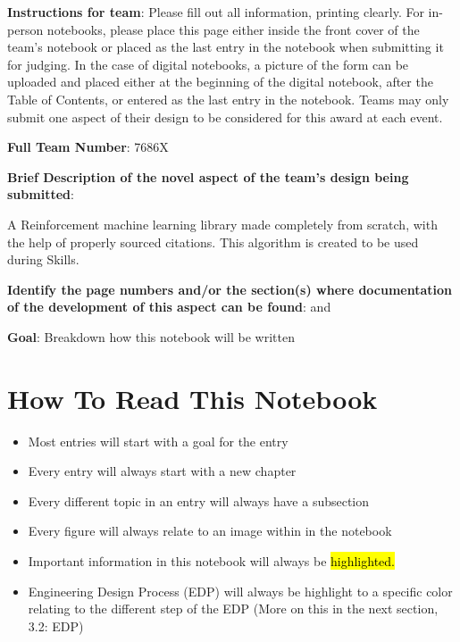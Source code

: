 \textbf{Instructions for team}: Please fill out all information, printing clearly. For in-person notebooks, please place this page either inside the front cover of the team’s notebook or placed as the last entry in the notebook when submitting it for judging. In the case of digital notebooks, a picture of the form can be uploaded and placed either at the beginning of the digital notebook, after the Table of Contents, or entered as the last entry in the notebook. Teams may only submit one aspect of their design to be considered for this award at each event.

\vspace{1cm}
\textbf{Full Team Number}: 7686X 

\vspace{1cm}
\textbf{Brief Description of the novel aspect of the team’s design being submitted}:

A Reinforcement machine learning library made completely from scratch, with the help of properly sourced citations. This algorithm is created to be used during Skills. 
\vspace{1cm}


\textbf{Identify the page numbers and/or the section(s) where documentation of the
development of this aspect can be found}: 
  and 


\label{Planning,-EDP,-&-Setup}
\textbf{Goal}: Breakdown how this notebook will be written


    \section*{How To Read This Notebook}
    
    \begin{itemize}
        \item Most entries will start with a goal for the entry
        \item Every entry will always start with a new chapter
        \item Every different topic in an entry will always have a subsection 
        \item Every figure will always relate to an image within in the notebook 
        \item Important information in this notebook will always be \hl{highlighted.}
        \item Engineering Design Process (EDP) will always be highlight to a specific color relating to the different step of the EDP (More on this in the next section, 3.2: EDP)
    \end{itemize}
